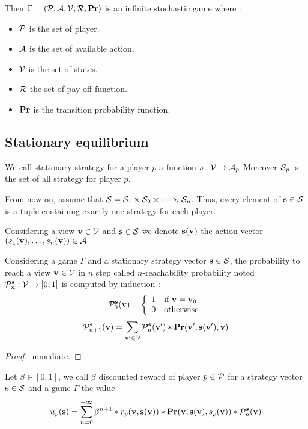 Then $\Gamma = (\mathcal{P},\mathcal{A},\mathcal{V},\mathcal{R},\mathbf{Pr})$ is an infinite stochastic game where :
\begin{itemize}
	\item $\mathcal{P}$ is the set of player.
	\item $\mathcal{A}$ is the set of available action.
	\item $\mathcal{V}$ is the set of states.
	\item $\mathcal{R}$ the set of pay-off function.
	\item $\mathbf{Pr}$ is the transition probability function.
\end{itemize} 


\subsection{Stationary equilibrium}

\begin{mydef}
	We call stationary strategy for a player $p$ a function $s : \mathcal{V} \rightarrow \mathcal{A}_p$ 
	Moreover $\mathcal{S}_p$ is the set of all strategy for player $p$. 
\end{mydef}


From now on, assume that $\mathcal{S} = \mathcal{S}_{1} \times \mathcal{S}_{2} \times \cdots \times \mathcal{S}_{n}$. Thus, every element of $\mathbf{s} \in \mathcal{S}$ is a tuple containing exactly one strategy for each player.

Considering a view $\mathbf{v} \in \mathcal{V}$ and $\mathbf{s} \in \mathcal{S}$ we denote $\mathbf{s}(\mathbf{v})$ the action vector $(s_{1}(\mathbf{v}),\ldots,s_{n}(\mathbf{v})) \in \mathcal{A}$ 
\begin{myprop}
	Considering a game $\Gamma$ and a stationary strategy vector $\mathbf{s} \in \mathcal{S}$, 
	the probability to reach a view $\mathbf{v} \in \mathcal{V}$ in $n$ step called $n$-reachability probability noted $\mathcal{P}^{\mathbf{s}}_n : \mathcal{V} \rightarrow [0;1]$ is computed by induction :
	$$\mathcal{P}^{\mathbf{s}}_0(\mathbf{v}) = \left\{\begin{array}{ll}
	1 & \mbox{if } \mathbf{v} = \mathbf{v}_0 \\
	0 & \mbox{otherwise}
	\end{array}\right.$$
	$$\mathcal{P}^{\mathbf{s}}_{n+1}(\mathbf{v}) = \sum_{\mathbf{v}' \in \mathcal{V}} \mathcal{P}^{\mathbf{s}}_{n}(\mathbf{v}') * \mathbf{Pr}(\mathbf{v}',\mathbf{s}(\mathbf{v}'),\mathbf{v})$$
\end{myprop}

\begin{proof}
	immediate.
\end{proof}


\begin{mydef}
	Let $\beta \in [0,1]$, we call $\beta$ discounted reward of player $p \in \mathcal{P}$ for a strategy vector $\mathbf{s} \in \mathcal{S}$ and a game $\Gamma$ the value 
	$$u_p(\mathbf{s}) = 	\sum_{n=0}^{+\infty}\beta^{n+1} * r_p(\mathbf{v},\mathbf{s}(\mathbf{v})) * \mathbf{Pr}(\mathbf{v},\mathbf{s}(\mathbf{v}),s_p(\mathbf{v}))*\mathcal{P}^{\mathbf{s}}_{n}(\mathbf{v}) $$
\end{mydef}

